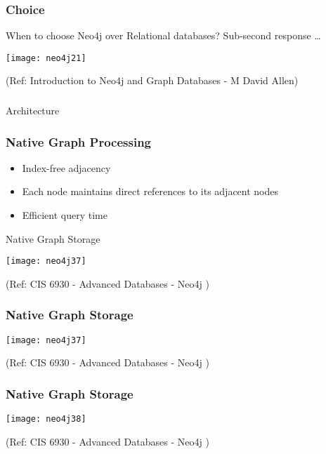 \begin{frame}[fragile]\frametitle{Choice}
When to choose Neo4j over Relational databases? Sub-second response \ldots


\begin{center}
\texttt{[image: neo4j21]}
\end{center}	    

{\tiny (Ref: Introduction to Neo4j and Graph Databases
 - M David Allen)}

\end{frame}

\begin{frame}[fragile]\frametitle{}
\begin{center}
{\Large Architecture}
\end{center}
\end{frame}

\begin{frame}\frametitle{Native Graph Processing}



\begin{itemize}
\item Index-free adjacency
\item Each node maintains direct references to its adjacent nodes
\item Efficient query time
\end{itemize}

Native Graph Storage

\begin{center}
\texttt{[image: neo4j37]}
\end{center}	  


{\tiny (Ref: CIS 6930 - Advanced Databases - Neo4j )}
\end{frame}

\begin{frame}\frametitle{Native Graph Storage}



\begin{center}
\texttt{[image: neo4j37]}
\end{center}	  


{\tiny (Ref: CIS 6930 - Advanced Databases - Neo4j )}
\end{frame}

\begin{frame}\frametitle{Native Graph Storage}



\begin{center}
\texttt{[image: neo4j38]}
\end{center}	  


{\tiny (Ref: CIS 6930 - Advanced Databases - Neo4j )}
\end{frame}
